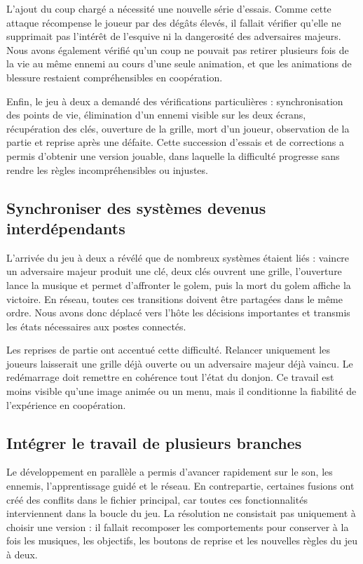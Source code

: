 \documentclass[a4paper,12pt]{article}
\begin{document}
L'ajout du coup chargé a nécessité une nouvelle série d'essais. Comme cette attaque
récompense le joueur par des dégâts élevés, il fallait vérifier qu'elle ne supprimait
pas l'intérêt de l'esquive ni la dangerosité des adversaires majeurs. Nous avons
également vérifié qu'un coup ne pouvait pas retirer plusieurs fois de la vie au même
ennemi au cours d'une seule animation, et que les animations de blessure restaient
compréhensibles en coopération.

Enfin, le jeu à deux a demandé des vérifications particulières : synchronisation des
points de vie, élimination d'un ennemi visible sur les deux écrans, récupération des
clés, ouverture de la grille, mort d'un joueur, observation de la partie et reprise
après une défaite. Cette succession d'essais et de corrections a permis d'obtenir une
version jouable, dans laquelle la difficulté progresse sans rendre les règles
incompréhensibles ou injustes.

\subsection{Synchroniser des systèmes devenus interdépendants}

L'arrivée du jeu à deux a révélé que de nombreux systèmes étaient liés : vaincre un adversaire majeur
produit une clé, deux clés ouvrent une grille, l'ouverture lance la musique et permet
d'affronter le golem, puis la mort du golem affiche la victoire. En réseau, toutes ces
transitions doivent être partagées dans le même ordre. Nous avons donc déplacé vers
l'hôte les décisions importantes et transmis les états nécessaires aux postes connectés.

Les reprises de partie ont accentué cette difficulté. Relancer uniquement les joueurs
laisserait une grille déjà ouverte ou un adversaire majeur déjà vaincu. Le redémarrage doit remettre
en cohérence tout l'état du donjon. Ce travail est moins visible qu'une image animée ou un
menu, mais il conditionne la fiabilité de l'expérience en coopération.

\newpage
\subsection{Intégrer le travail de plusieurs branches}

Le développement en parallèle a permis d'avancer rapidement sur le son, les ennemis,
l'apprentissage guidé et le réseau. En contrepartie, certaines fusions ont créé des conflits
dans le fichier principal, car toutes ces fonctionnalités interviennent dans la boucle
du jeu. La résolution ne consistait pas uniquement à choisir une version : il fallait
recomposer les comportements pour conserver à la fois les musiques, les objectifs,
les boutons de reprise et les nouvelles règles du jeu à deux.
\end{document}
